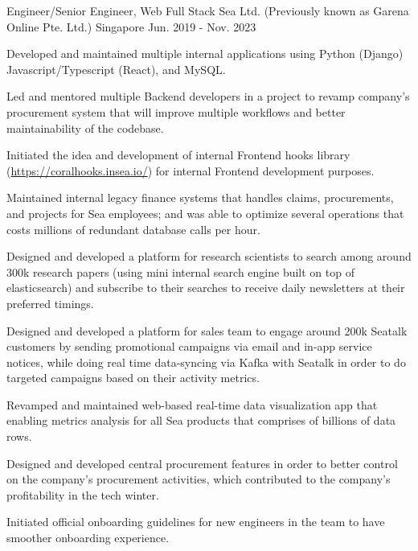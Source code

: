 \begin{cventries}
  \cventry
  {Engineer/Senior Engineer, Web Full Stack} %
  {Sea Ltd. (Previously known as Garena Online Pte. Ltd.)} %
  {Singapore} %
  {Jun. 2019 - Nov. 2023} %
  {
    \begin{cvitems} %
      \item {Developed and maintained multiple internal applications using Python (Django) Javascript/Typescript (React), and MySQL.}
      \item {Led and mentored multiple Backend developers in a project to revamp company's procurement system that will improve multiple workflows and better maintainability of the codebase.}
      \item {Initiated the idea and development of internal Frontend hooks library (\url{https://coralhooks.insea.io/}) for internal Frontend development purposes.}
      \item {Maintained internal legacy finance systems that handles claims, procurements, and projects for Sea employees; and was able to optimize several operations that costs millions of redundant database calls per hour.}
      \item {Designed and developed a platform for research scientists to search among around 300k research papers (using mini internal search engine built on top of elasticsearch) and subscribe to their searches to receive daily newsletters at their preferred timings.}
      \item {Designed and developed a platform for sales team to engage around 200k Seatalk customers by sending promotional campaigns via email and in-app service notices, while doing real time data-syncing via Kafka with Seatalk in order to do targeted campaigns based on their activity metrics.}
      \item {Revamped and maintained web-based real-time data visualization app that enabling metrics analysis for all Sea products that comprises of billions of data rows.}
      \item {Designed and developed central procurement features in order to better control on the company's procurement activities, which contributed to the company's profitability in the tech winter.}
      \item {Initiated official onboarding guidelines for new engineers in the team to have smoother onboarding experience.}
    \end{cvitems}
}


\end{cventries}
